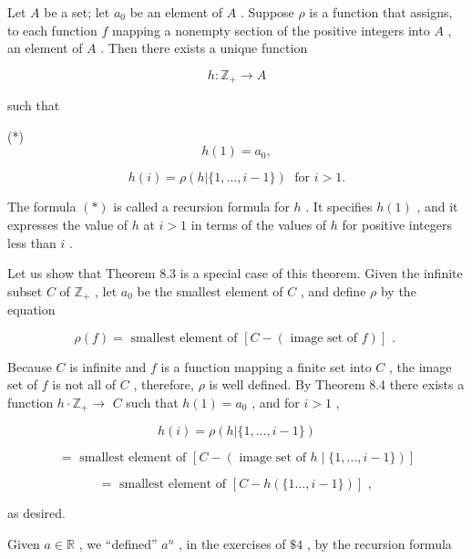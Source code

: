 \begin{theorem} Let \(A\) be a set; let \({a}_{0}\) be an element of \(A\) . Suppose \(\rho\) is a function that assigns, to each function \(f\) mapping a nonempty section of the positive integers into \(A\) , an element of \(A\) . Then there exists a unique function

\[
h : {\mathbb{Z}}_{ + } \rightarrow  A
\]

such that

(*)
\[
h\left( 1\right)  = {a}_{0},
\]

\[
h\left( i\right)  = \rho \left( {h|\{ 1,\ldots ,i - 1\} }\right) \;\text{ for }i > 1.
\]

The formula \(\left( *\right)\) is called a recursion formula for \(h\) . It specifies \(h\left( 1\right)\) , and it expresses the value of \(h\) at \(i > 1\) in terms of the values of \(h\) for positive integers less than \(i\) .

\begin{centeredblock}
\begin{example} Let us show that Theorem 8.3 is a special case of this theorem. Given the infinite subset \(C\) of \({\mathbb{Z}}_{ + }\) , let \({a}_{0}\) be the smallest element of \(C\) , and define \(\rho\) by the equation

\[
\rho \left( f\right)  = \text{ smallest element of }\left\lbrack  {C - \left( {\text{ image set of }f}\right) }\right\rbrack  \text{ . }
\]

Because \(C\) is infinite and \(f\) is a function mapping a finite set into \(C\) , the image set of \(f\) is not all of \(C\) , therefore, \(\rho\) is well defined. By Theorem 8.4 there exists a function \(h \cdot  {\mathbb{Z}}_{ + } \rightarrow\)  \(C\) such that \(h\left( 1\right)  = {a}_{0}\) , and for \(i > 1\) ,

\[
h\left( i\right)  = \rho \left( {h|\{ 1,\ldots ,i - 1\} }\right)
\]

\[
= \text{ smallest element of }\left\lbrack  {C - \left( {\text{ image set of }h \mid  \{ 1,\ldots ,i - 1\} }\right) }\right\rbrack
\]

\[
= \text{ smallest element of }\left\lbrack  {C - h\left( {\{ 1\ldots ,i - 1\} }\right) }\right\rbrack  \text{ , }
\]

as desired.
\end{example}
\end{centeredblock}

\begin{centeredblock}
\begin{example} Given \(a \in  \mathbb{R}\) , we ``defined'' \({a}^{n}\) , in the exercises of \(\$ 4\) , by the recursion formula


\end{example}
\end{centeredblock}
\end{theorem}
